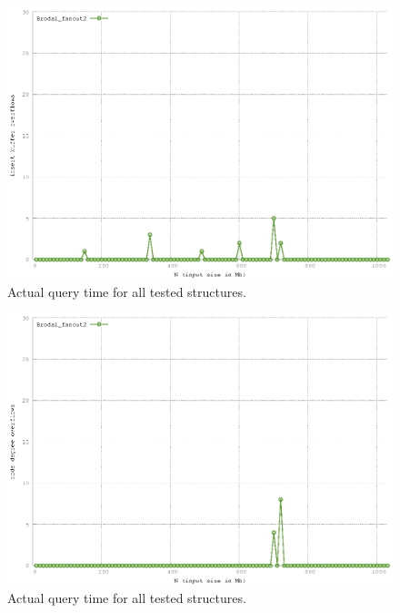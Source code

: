 \documentclass[twoside,11pt,openright]{report}
\begin{document}
\begin{figure}[htp!]
\includegraphics[width=\textwidth]{../src/experiments/query_experiment_results/final2/ibo}
\caption{Actual query time for all tested structures.}
\label{fig:result_query_search_complexity}
\end{figure}

\begin{figure}[htp!]
\includegraphics[width=\textwidth]{../src/experiments/query_experiment_results/final2/ndo}
\caption{Actual query time for all tested structures.}
\label{fig:result_query_search_complexity}
\end{figure}
\end{document}
